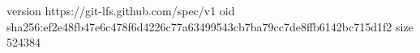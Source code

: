 version https://git-lfs.github.com/spec/v1
oid sha256:ef2e48fb47e6c478f6d4226c77a63499543cb7ba79cc7de8ffb6142bc715d1f2
size 524384

